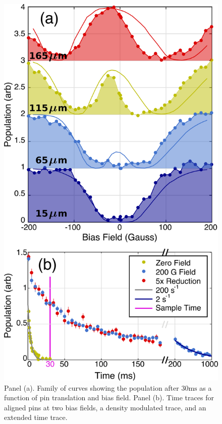 \documentclass[%
 reprint,
groupedaddress,
 amsmath,amssymb,
 aps,
prl,
]{revtex4-1}
\begin{document}
\begin{figure}[tb]
\includegraphics[width=\linewidth]{VWFig/tim-style-by-dave-1hz.png}%
\caption{
Panel (a). Family of curves showing the population after $30 \text{ms}$ as a function of pin translation and bias field. Panel (b). Time traces for aligned pins at two bias fields, a density modulated trace, and an extended time trace.
\label{fig:WVplot}}
\end{figure}
\end{document}
